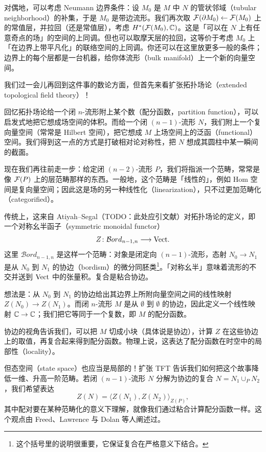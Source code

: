 对偶地，可以考虑 Neumann 边界条件：设 $M_0$ 是 $M$ 中 $N$ 的管状邻域（tubular neighborhood）的补集，于是 $M_0$ 是带边流形。我们再次取 $\mathcal{F}(\partial M_0)\leftarrow\mathcal{F}(M_0)$ 上的常值层，并拉回（还是常值层），考虑 $H^*(\mathcal{F}(M_0),\mathbb{C})$。这是「可以在 $N$ 上有任意奇点的场」的空间的上同调。但也可以取摩天层的拉回，这等价于考虑 $M_0$ 上「在边界上带平凡化」的联络空间的上同调。你还可以在这里放更多一般的条件；边界上的每个层都是一台机器，给你体流形（bulk manifold）上一个新的向量空间。

我们过一会儿再回到这件事的数论方面，但首先来看扩张拓扑场论（extended topological field theory）！

回忆拓扑场论给一个闭 $n$-流形附上某个数（配分函数，partition function），可以启发式地把它想成场空间的体积。而给一个闭 $(n-1)$-流形 $N$，我们附上一个复向量空间（常常是 Hilbert 空间），把它想成 $M$ 上场空间上的泛函（functional）空间。我们得到这一点的方式是打破相对论对称性，把 $N$ 想成其圆柱中某一瞬间的截面。

现在我们再往前走一步：给定闭 $(n-2)$-流形 $P$，我们将指派一个范畴，常常是像 $\mathcal{F}(P)$ 上的层范畴那样的东西。一般地，这个范畴是「线性的」，例如 Hom 空间是复向量空间；因此这是场的另一种线性化（linearization），只不过更加范畴化（categorified）。

传统上，这来自 Atiyah–Segal（TODO：此处应引文献）对拓扑场论的定义，即一个对称幺半函子（symmetric monoidal functor）
\[
  Z\colon \mathcal{B}ord_{n-1,n}\longrightarrow \mathrm{Vect}.
\]
这里 $\mathcal{B}ord_{n-1,n}$ 是这样一个范畴：对象是闭定向 $(n-1)$-流形，态射 $N_0\to N_1$ 是从 $N_0$ 到 $N_1$ 的协边（bordism）的微分同胚类\footnote{这个括号里的说明很重要，它保证复合在严格意义下结合。}。「对称幺半」意味着流形的不交并送到 $\mathrm{Vect}$ 中的张量积。复合是粘合协边。

想法是：从 $N_0$ 到 $N_1$ 的协边给出其边界上所附向量空间之间的线性映射 $Z(N_0)\to Z(N_1)$。而闭 $n$-流形 $M$ 是从 $\emptyset$ 到 $\emptyset$ 的协边，因此定义一个线性映射 $\mathbb{C}\to\mathbb{C}$；我们把它等同于一个复数，即 $M$ 的配分函数。

协边的视角告诉我们，可以把 $M$ 切成小块（具体说是协边），计算 $Z$ 在这些协边上的取值，再复合起来得到配分函数。物理上说，这表达了配分函数在时空中的局部性（locality）。

但态空间（state space）也应当是局部的！扩张 TFT 告诉我们如何把这个故事降低一维、升高一阶范畴。若闭 $(n-1)$-流形 $N$ 分解为协边的复合 $N=N_1\cup_P N_2$，我们希望表达
\[
  Z(N) = \langle Z(N_1), Z(N_2)\rangle_{Z(P)},
\]
其中配对要在某种范畴化的意义下理解，就像我们通过粘合计算配分函数一样。这个观点由 Freed、Lawrence 与 Dolan 等人阐述过。

